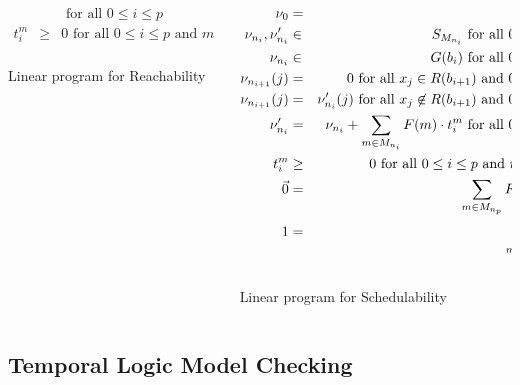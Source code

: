 \documentclass[9pt]{beamer}
\begin{document}
{\begin{itemize}
\begin{itemize}
\begin{flushleft}
{\begin{columns}[t]
\begin{column}{0.55\textwidth}
\begin{eqnarray}
							& &\text{ for all $0 \leq i \leq p$}\nonumber\\%
							t_i^m  &\geq&  0 \text{ for all $0 \leq i \leq p$ and  $m \in M_{n_i}$} \nonumber
						\end{eqnarray}
						\newline
						\\[2.4pt]
						{\large Linear program for Reachability}
					\end{column}
					\pause
					\begin{column}{0.6\textwidth}
						\begin{eqnarray}
							\nu_0 &=& \nu_{n_0} \nonumber \\
							\nu_{n_i}, \nu_{n_i}'  & \in & S_{M_{n_i}} \text{ for all $0 \leq i \leq p$}
							\nonumber \\
							\nu_{n_i}   & \in & G(b_i) \text{ for all $0 < i \leq p$}
							\nonumber \\
							\nu_{n_{i+1}}(j) &=& 0  \text{ for all $x_j \in R(b_{i+1})$ and  $0 < i \leq p$}
							\nonumber \\
							\nu_{n_{i+1}}(j) &=& \nu_{n_i}'(j)  \text{ for all $x_j \not \in R(b_{i+1})$ and  $0 < i \leq p$}
							\nonumber \\
							\nu_{n_i}'  & = & \nu_{n_i} + \sum_{m \in M_{n_i}} F(m) \cdot t_i^m \text{
							for all $0 \leq i \leq p$} \nonumber\\%
							t_i^m  &\geq&  0 \text{ for all $0 \leq i \leq p$ and $m \in M_{n_i}$} \nonumber\\ 
							\vzero &=& \sum_{m \in M_{n_p}} F(m) \cdot t_p^m  \nonumber\\
							1 &=& \sum_{m \in M_{n_p}} t_p^m \nonumber
						\end{eqnarray}
						\newline
						\\[1pt]
						{\large Linear program for Schedulability}
					\end{column}
				\end{columns}
				}
				\end{flushleft}
				
				
			\end{itemize}
	\end{itemize}
}

\subsection{Temporal Logic Model Checking}
\end{document}
